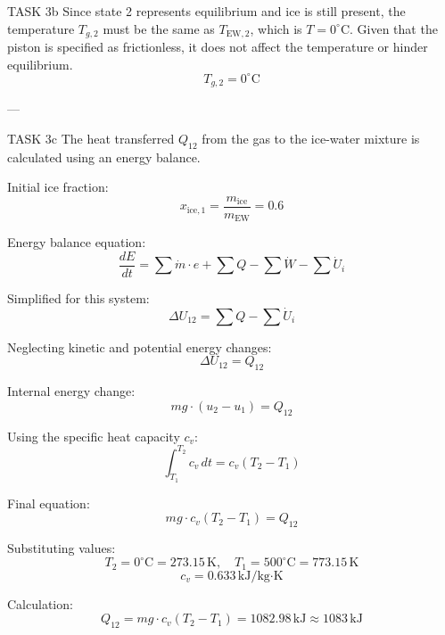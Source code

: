 TASK 3b  
Since state 2 represents equilibrium and ice is still present, the temperature \( T_{g,2} \) must be the same as \( T_{\text{EW},2} \), which is \( T = 0^\circ\text{C} \).  
Given that the piston is specified as frictionless, it does not affect the temperature or hinder equilibrium.  
\[
T_{g,2} = 0^\circ\text{C}
\]

---

TASK 3c  
The heat transferred \( Q_{12} \) from the gas to the ice-water mixture is calculated using an energy balance.  

Initial ice fraction:  
\[
x_{\text{ice},1} = \frac{m_{\text{ice}}}{m_{\text{EW}}} = 0.6
\]

Energy balance equation:  
\[
\frac{dE}{dt} = \sum \dot{m} \cdot e + \sum Q - \sum \dot{W} - \sum \dot{U}_i
\]

Simplified for this system:  
\[
\Delta U_{12} = \sum Q - \sum \dot{U}_i
\]

Neglecting kinetic and potential energy changes:  
\[
\Delta U_{12} = Q_{12}
\]

Internal energy change:  
\[
mg \cdot (u_2 - u_1) = Q_{12}
\]

Using the specific heat capacity \( c_v \):  
\[
\int_{T_1}^{T_2} c_v \, dt = c_v (T_2 - T_1)
\]

Final equation:  
\[
mg \cdot c_v (T_2 - T_1) = Q_{12}
\]

Substituting values:  
\[
T_2 = 0^\circ\text{C} = 273.15 \, \text{K}, \quad T_1 = 500^\circ\text{C} = 773.15 \, \text{K}
\]
\[
c_v = 0.633 \, \text{kJ/kg·K}
\]

Calculation:  
\[
Q_{12} = mg \cdot c_v (T_2 - T_1) = 1082.98 \, \text{kJ} \approx 1083 \, \text{kJ}
\]